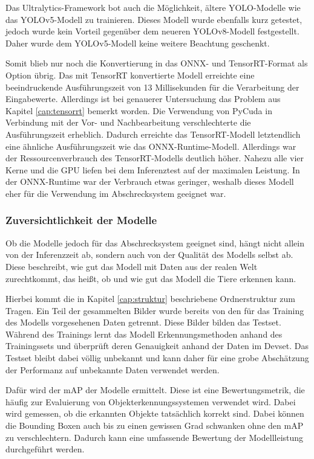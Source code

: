 Das Ultralytics-Framework bot auch die Möglichkeit, ältere YOLO-Modelle wie das YOLOv5-Modell zu trainieren. Dieses Modell wurde ebenfalls kurz getestet, jedoch wurde kein Vorteil gegenüber dem neueren YOLOv8-Modell festgestellt. Daher wurde dem YOLOv5-Modell keine weitere Beachtung geschenkt.

Somit blieb nur noch die Konvertierung in das ONNX- und TensorRT-Format als Option übrig. Das mit TensorRT konvertierte Modell erreichte eine beeindruckende Ausführungszeit von 13 Millisekunden für die Verarbeitung der Eingabewerte. Allerdings ist bei genauerer Untersuchung das Problem aus Kapitel \ref{cap:tensorrt} bemerkt worden. Die Verwendung von PyCuda in Verbindung mit der Vor- und Nachbearbeitung verschlechterte die Ausführungszeit erheblich. Dadurch erreichte das TensorRT-Modell letztendlich eine ähnliche Ausführungszeit wie das ONNX-Runtime-Modell. Allerdings war der Ressourcenverbrauch des TensorRT-Modells deutlich höher. Nahezu alle vier Kerne und die \ac{GPU} liefen bei dem Inferenztest auf der maximalen Leistung. In der ONNX-Runtime war der Verbrauch etwas geringer, weshalb dieses Modell eher für die Verwendung im Abschrecksystem geeignet war.

\subsubsection{Zuversichtlichkeit der Modelle} \label{cap:qual_erk}

Ob die Modelle jedoch für das Abschrecksystem geeignet sind, hängt nicht allein von der Inferenzzeit ab, sondern auch von der Qualität des Modells selbst ab. Diese beschreibt, wie gut das Modell mit Daten aus der realen Welt zurechtkommt, das heißt, ob und wie gut das Modell die Tiere erkennen kann.

Hierbei kommt die in Kapitel \ref{cap:struktur} beschriebene Ordnerstruktur zum Tragen. Ein Teil der gesammelten Bilder wurde bereits von den für das Training des Modells vorgesehenen Daten getrennt. Diese Bilder bilden das Testset.
\\
Während des Trainings lernt das Modell Erkennungsmethoden anhand des Trainingssets und überprüft deren Genauigkeit anhand der Daten im Devset. Das Testset bleibt dabei völlig unbekannt und kann daher für eine grobe Abschätzung der Performanz auf unbekannte Daten verwendet werden.

Dafür wird der \acf{mAP} der Modelle ermittelt. Diese ist eine  Bewertungsmetrik, die häufig zur Evaluierung von Objekterkennungssystemen verwendet wird. Dabei wird gemessen, ob die erkannten Objekte tatsächlich korrekt sind. Dabei können die Bounding Boxen auch bis zu einen gewissen Grad schwanken ohne den \ac{mAP} zu verschlechtern. Dadurch kann eine umfassende Bewertung der Modellleistung durchgeführt werden. \cite{cv_Szeliski}

